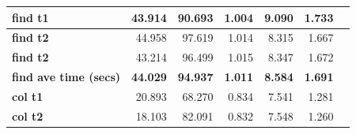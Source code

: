 \documentclass[12pt]{article}
\begin{document}
\begin{center}
\begin{tabular}{|l|r|r|r|r|r|l|}
    \textbf{find t1}                 & 43.914                            & 90.693                            & 1.004                                                                                    & 9.090                                                                                       & 1.733                                                                                         &                                    \\ \hline
    \textbf{find t2}                 & 44.958                            & 97.619                            & 1.014                                                                                    & 8.315                                                                                       & 1.667                                                                                         &                                    \\ \hline
    \textbf{find t2}                 & 43.214                            & 96.499                            & 1.015                                                                                    & 8.347                                                                                       & 1.672                                                                                         &                                    \\ \hline
    \textbf{find ave time (secs)}    & \textbf{44.029}                   & \textbf{94.937}                   & \textbf{1.011}                                                                           & \textbf{8.584}                                                                              & \textbf{1.691}                                                                                & \textbf{}                          \\ \hline
    \textbf{col t1}                  & 20.893                            & 68.270                            & 0.834                                                                                    & 7.541                                                                                       & 1.281                                                                                         &                                    \\ \hline
    \textbf{col t2}                  & 18.103                            & 82.091                            & 0.832                                                                                    & 7.548                                                                                       & 1.260                                                                                         &                                    \\ \hline

\end{tabular}
\end{center}
\end{document}
